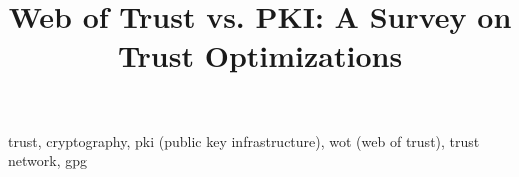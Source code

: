 \documentclass[conference,compsoc,a4paper]{IEEEtran}
\begin{document}
\title{Web of Trust vs. PKI: A Survey on Trust Optimizations}

\author{%
}

\maketitle

\begin{abstract}

\end{abstract}

\begin{IEEEkeywords}
trust, cryptography, pki (public key infrastructure), wot (web of trust), trust network, gpg
\end{IEEEkeywords}











\balance



\end{document}
